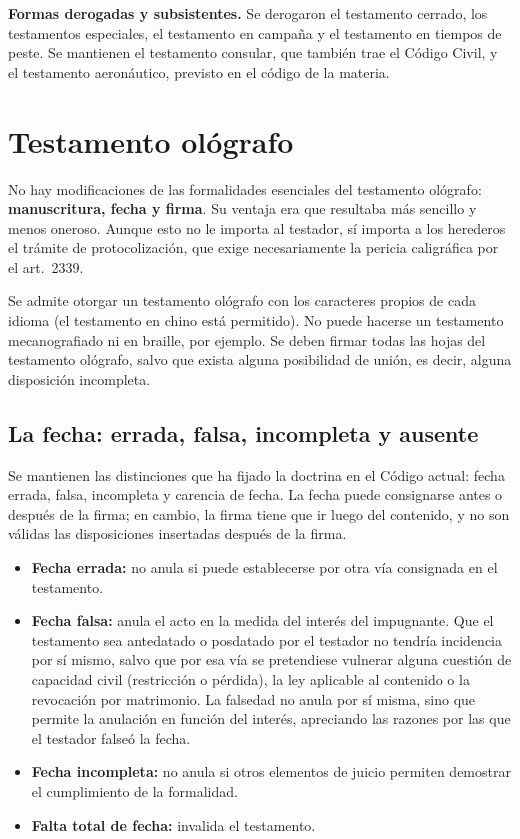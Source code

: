\documentclass[12pt,oneside]{book}
\begin{document}
\textbf{Formas derogadas y subsistentes.} Se derogaron el testamento cerrado, los testamentos especiales, el testamento en campaña y el testamento en tiempos de peste. Se mantienen el testamento consular, que también trae el Código Civil, y el testamento aeronáutico, previsto en el código de la materia.

\section{Testamento ológrafo}

No hay modificaciones de las formalidades esenciales del testamento ológrafo: \textbf{manuscritura, fecha y firma}. Su ventaja era que resultaba más sencillo y menos oneroso. Aunque esto no le importa al testador, sí importa a los herederos el trámite de protocolización, que exige necesariamente la pericia caligráfica por el art.~2339.

Se admite otorgar un testamento ológrafo con los caracteres propios de cada idioma (el testamento en chino está permitido). No puede hacerse un testamento mecanografiado ni en braille, por ejemplo. Se deben firmar todas las hojas del testamento ológrafo, salvo que exista alguna posibilidad de unión, es decir, alguna disposición incompleta.

\subsection{La fecha: errada, falsa, incompleta y ausente}

Se mantienen las distinciones que ha fijado la doctrina en el Código actual: fecha errada, falsa, incompleta y carencia de fecha. La fecha puede consignarse antes o después de la firma; en cambio, la firma tiene que ir luego del contenido, y no son válidas las disposiciones insertadas después de la firma.

\begin{itemize}
    \item \textbf{Fecha errada:} no anula si puede establecerse por otra vía consignada en el testamento.
    \item \textbf{Fecha falsa:} anula el acto en la medida del interés del impugnante. Que el testamento sea antedatado o posdatado por el testador no tendría incidencia por sí mismo, salvo que por esa vía se pretendiese vulnerar alguna cuestión de capacidad civil (restricción o pérdida), la ley aplicable al contenido o la revocación por matrimonio. La falsedad no anula por sí misma, sino que permite la anulación en función del interés, apreciando las razones por las que el testador falseó la fecha.
    \item \textbf{Fecha incompleta:} no anula si otros elementos de juicio permiten demostrar el cumplimiento de la formalidad.
    \item \textbf{Falta total de fecha:} invalida el testamento.
\end{itemize}
\end{document}
